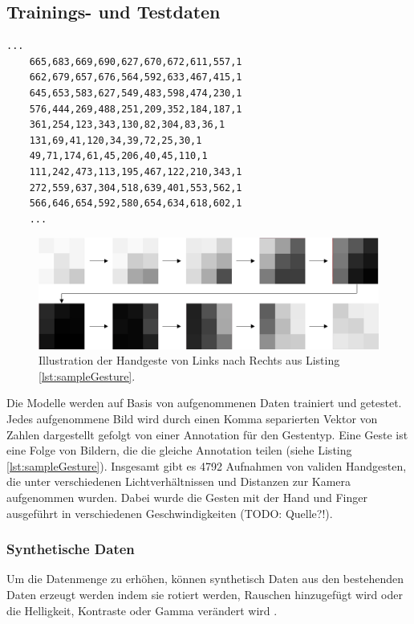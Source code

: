 \subsection{Trainings- und Testdaten}
\begin{lstlisting}[label=lst:sampleGesture,caption={Beispiel einer gespeicherten Handgeste von Links nach Rechts.}]
    ...
    665,683,669,690,627,670,672,611,557,1
    662,679,657,676,564,592,633,467,415,1
    645,653,583,627,549,483,598,474,230,1
    576,444,269,488,251,209,352,184,187,1
    361,254,123,343,130,82,304,83,36,1
    131,69,41,120,34,39,72,25,30,1
    49,71,174,61,45,206,40,45,110,1
    111,242,473,113,195,467,122,210,343,1
    272,559,637,304,518,639,401,553,562,1
    566,646,654,592,580,654,634,618,602,1
    ...
\end{lstlisting}
\begin{figure}
    \centering
    \includegraphics[width=\linewidth]{images/sample_gesture_total.jpg}
    \caption{Illustration der Handgeste von Links nach Rechts aus Listing \ref{lst:sampleGesture}.}
    \label{fig:sample_gesture}
\end{figure}
Die Modelle werden auf Basis von aufgenommenen Daten trainiert und getestet. Jedes aufgenommene Bild wird durch einen Komma separierten Vektor von Zahlen dargestellt gefolgt von einer Annotation für den Gestentyp.
Eine Geste ist eine Folge von Bildern, die die gleiche Annotation teilen (siehe Listing \ref{lst:sampleGesture}). Insgesamt gibt es 4792 Aufnahmen von validen Handgesten, die unter verschiedenen Lichtverhältnissen
und Distanzen zur Kamera aufgenommen wurden. Dabei wurde die Gesten mit der Hand und Finger ausgeführt in verschiedenen Geschwindigkeiten (TODO: Quelle?!).
\subsubsection{Synthetische Daten}
\label{sec:synthetischeDaten}
Um die Datenmenge zu erhöhen, können synthetisch Daten aus den bestehenden Daten erzeugt werden indem sie rotiert werden, Rauschen hinzugefügt wird oder die Helligkeit, Kontraste oder
Gamma verändert wird \cite{venzkeArticle}.
